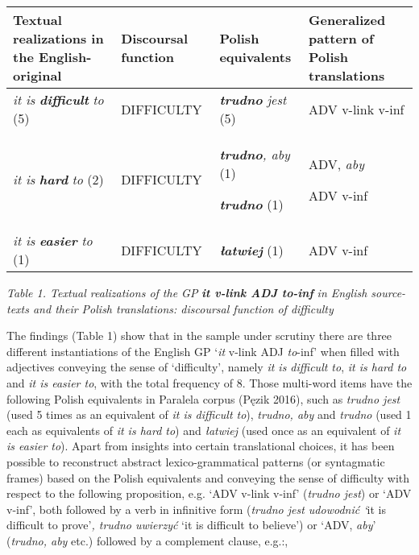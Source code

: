 \documentclass[12pt]{article}
\newenvironment{styleStandard}{\setlength\leftskip{0cm}\setlength\rightskip{0cm plus 1fil}\setlength\parindent{0cm}\setlength\parfillskip{0pt plus 1fil}\setlength\parskip{0in plus 1pt}\writerlistparindent\writerlistleftskip\leavevmode\normalfont\normalsize\writerlistlabel\ignorespaces}{\unskip\vspace{0.111in plus 0.0111in}\par}
\newcommand\writerlistleftskip{}
\newcommand\writerlistparindent{}
\newcommand\writerlistlabel{}
\begin{document}
\begin{flushleft}
\tablefirsthead{}
\tablehead{}
\tabletail{}
\tablelasttail{}
\begin{supertabular}{|m{1.1045599in}|m{1.1615599in}|m{1.0990599in}|m{1.1184598in}|}
\hline
\textbf{Textual realizations in the English-original} &
\textbf{Discoursal function} &
\textbf{Polish equivalents} &
\textbf{Generalized pattern of Polish translations }\\\hline
\textit{it is }\textbf{\textit{difficult }}\textit{to} (5) &
DIFFICULTY &
\textbf{\textit{trudno}}\textit{ jest} (5) &
ADV v-link v-inf\\\hline
\textit{it is }\textbf{\textit{hard}}\textit{ to} (2) &
DIFFICULTY &
\textbf{\textit{trudno}}\textit{, aby} (1)

\textbf{\textit{trudno}} (1) &
ADV, \textit{aby} 

ADV v-inf\\\hline
\textit{it is }\textbf{\textit{easier}}\textit{ to} (1) &
DIFFICULTY &
\textbf{\textit{łatwiej}} (1)  &
ADV v{}-inf\\\hline
\end{supertabular}
\end{flushleft}
\begin{styleStandard}
\textit{Table 1. Textual realizations of the GP }\textbf{\textit{it v-link ADJ to-inf}}\textit{ in English source-texts and their Polish translations: discoursal function of difficulty}
\end{styleStandard}

\begin{styleStandard}
The findings (Table 1) show that in the sample under scrutiny there are three different instantiations of the English GP ‘\textit{it} v-link ADJ \textit{to}{}-inf’ when filled with adjectives conveying the sense of ‘difficulty’, namely \textit{it is difficult to}, \textit{it is hard to} and \textit{it is easier to}, with the total frequency of 8. Those multi-word items have the following Polish equivalents in Paralela corpus (Pęzik 2016), such as \textit{trudno jest} (used 5 times as an equivalent of \textit{it is difficult to}), \textit{trudno, aby }and\textit{ trudno} (used 1 each as equivalents of \textit{it is hard to}) and \textit{łatwiej} (used once as an equivalent of \textit{it is easier to}). Apart from insights into certain translational choices, it has been possible to reconstruct abstract lexico-grammatical patterns (or syntagmatic frames) based on the Polish equivalents and conveying the sense of difficulty with respect to the following proposition, e.g. ‘ADV v-link v-inf’ (\textit{trudno jest}) or ‘ADV v-inf’, both followed by a verb in infinitive form (\textit{trudno jest udowodnić ‘}it is difficult to prove’\textit{, trudno uwierzyć }‘it is difficult to believe’) or ‘ADV, \textit{aby}’ (\textit{trudno, aby }etc.) followed by a complement clause, e.g.:,
\end{styleStandard}
\end{document}

